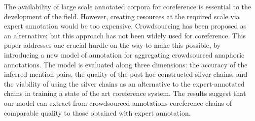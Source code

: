 The availability of large scale annotated corpora for coreference is essential to the development of the field. However, creating resources at the required scale via expert annotation would be too expensive. Crowdsourcing has been proposed as an alternative; but this approach has not been widely used for coreference. This paper addresses one crucial hurdle on the way to make this possible, by introducing a new model of annotation for aggregating crowdsourced anaphoric annotations. The model is evaluated along three dimensions: the accuracy of the inferred mention pairs, the quality of the post-hoc constructed silver chains, and the viability of using the silver chains as an alternative to the expert-annotated chains in training a state of the art coreference system. The results suggest that our model can extract from crowdsourced annotations coreference chains of comparable quality to those obtained with expert annotation.
